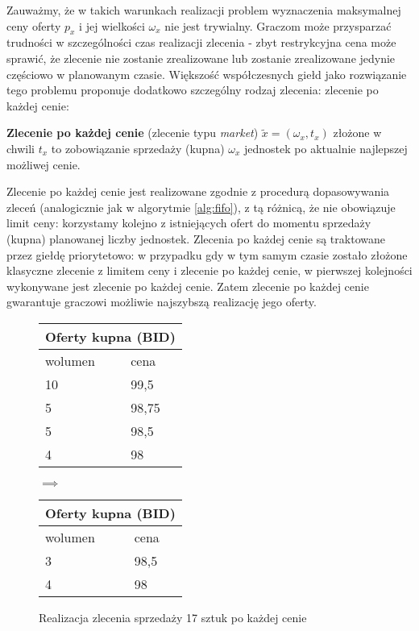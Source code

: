 Zauważmy, że w takich warunkach realizacji problem wyznaczenia maksymalnej ceny oferty $p_x$ i jej wielkości $\omega_x$ nie jest trywialny. Graczom może przysparzać trudności w szczególności czas realizacji zlecenia - zbyt restrykcyjna cena może sprawić, że zlecenie nie zostanie zrealizowane lub zostanie zrealizowane jedynie częściowo w planowanym czasie. Większość współczesnych giełd jako rozwiązanie tego problemu proponuje dodatkowo szczególny rodzaj zlecenia: zlecenie po każdej cenie: 

\begin{definition}\label{def:marketorder}
\textbf{Zlecenie po każdej cenie} (zlecenie typu \textit{market}) $\tilde{x} = (\omega_x, t_x)$ złożone w chwili $t_x$ to zobowiązanie sprzedaży (kupna) $\omega_x$ jednostek po aktualnie najlepszej możliwej cenie.
\end{definition}

Zlecenie po każdej cenie jest realizowane zgodnie z procedurą dopasowywania zleceń (analogicznie jak w algorytmie \ref{alg:fifo}), z tą różnicą, że nie obowiązuje limit ceny: korzystamy kolejno z istniejących ofert do momentu sprzedaży (kupna) planowanej liczby jednostek. Zlecenia po każdej cenie są traktowane przez giełdę priorytetowo: w przypadku gdy w tym samym czasie zostało złożone klasyczne zlecenie z limitem ceny i zlecenie po każdej cenie, w pierwszej kolejności wykonywane jest zlecenie po każdej cenie. Zatem zlecenie po każdej cenie gwarantuje graczowi możliwie najszybszą realizację jego oferty.

\begin{figure}[ht]

\begin{center}
\parbox{.35\linewidth}{
\begin{tabular}{ |l|l| }
\hline
\multicolumn{2}{|c|}{Oferty kupna (BID)} \\
\hline
 \rowcolor{palegreen} wolumen & cena \\
\hline
 \rowcolor{lightgrey} 10 & 99,5 \\
 \hline
  \rowcolor{lightgrey} 5 & 98,75 \\
\hline
  \rowcolor{palegreen2} 5 & 98,5 \\
\hline
  \rowcolor{palegreen} 4 & 98 \\
\hline
\end{tabular} $\implies$}
\parbox{.35\linewidth}{
\begin{tabular}{ |l|l| }
\hline
\multicolumn{2}{|c|}{Oferty kupna (BID)} \\
\hline
 \rowcolor{palegreen} wolumen & cena \\
\hline
  \rowcolor{palegreen} 3 & 98,5 \\
\hline
  \rowcolor{palegreen} 4 & 98 \\
\hline
\end{tabular}}
\end{center}
\caption{{Realizacja zlecenia sprzedaży 17 sztuk po każdej cenie}} \label{orderbook_2}
\end{figure}

